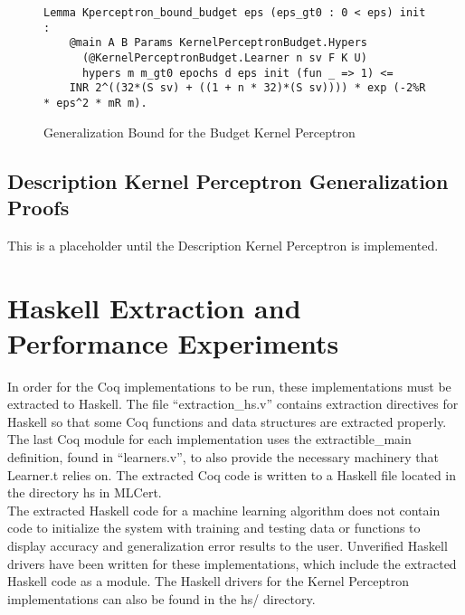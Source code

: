 \begin{figure}
    \caption{Generalization Bound for the Budget Kernel Perceptron}
    \label{KPBLemma}
    \begin{lstlisting}
Lemma Kperceptron_bound_budget eps (eps_gt0 : 0 < eps) init : 
    @main A B Params KernelPerceptronBudget.Hypers 
      (@KernelPerceptronBudget.Learner n sv F K U)
      hypers m m_gt0 epochs d eps init (fun _ => 1) <=
    INR 2^((32*(S sv) + ((1 + n * 32)*(S sv)))) * exp (-2%R * eps^2 * mR m).
    \end{lstlisting}
\end{figure}

\subsection{Description Kernel Perceptron Generalization Proofs}\label{KPDProofs}
This is a placeholder until the Description Kernel Perceptron is implemented.
\section{Haskell Extraction and Performance Experiments}\label{HaskellExtractionPerformance}
In order for the Coq implementations to be run, these implementations must be extracted to Haskell. The file ``extraction\_hs.v'' contains extraction directives for Haskell so that some Coq functions and data structures are extracted properly. The last Coq module for each implementation uses the extractible\_main definition, found in ``learners.v'', to also provide the necessary machinery that Learner.t relies on. The extracted Coq code is written to a Haskell file located in the directory hs in MLCert.
\\The extracted Haskell code for a machine learning algorithm does not contain code to initialize the system with training and testing data or functions to display accuracy and generalization error results to the user. Unverified Haskell drivers have been written for these implementations, which include the extracted Haskell code as a module. The Haskell drivers for the Kernel Perceptron implementations can also be found in the hs/ directory.
